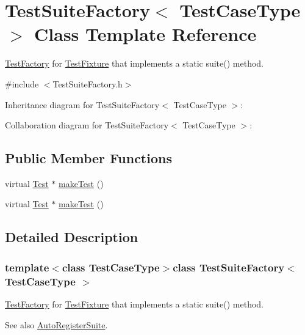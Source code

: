\hypertarget{class_test_suite_factory}{\section{Test\+Suite\+Factory$<$ Test\+Case\+Type $>$ Class Template Reference}
\label{class_test_suite_factory}
}


\hyperlink{class_test_factory}{Test\+Factory} for \hyperlink{class_test_fixture}{Test\+Fixture} that implements a static suite() method.  




{\ttfamily \#include $<$Test\+Suite\+Factory.\+h$>$}



Inheritance diagram for Test\+Suite\+Factory$<$ Test\+Case\+Type $>$\+:


Collaboration diagram for Test\+Suite\+Factory$<$ Test\+Case\+Type $>$\+:
\subsection*{Public Member Functions}
\begin{DoxyCompactItemize}
\item 
virtual \hyperlink{class_test}{Test} $\ast$ \hyperlink{class_test_suite_factory_a0790b11de1543fa894acd7069fd1f327}{make\+Test} ()
\item 
virtual \hyperlink{class_test}{Test} $\ast$ \hyperlink{class_test_suite_factory_a0790b11de1543fa894acd7069fd1f327}{make\+Test} ()
\end{DoxyCompactItemize}


\subsection{Detailed Description}
\subsubsection*{template$<$class Test\+Case\+Type$>$class Test\+Suite\+Factory$<$ Test\+Case\+Type $>$}

\hyperlink{class_test_factory}{Test\+Factory} for \hyperlink{class_test_fixture}{Test\+Fixture} that implements a static suite() method. 

\begin{DoxySeeAlso}{See also}
\hyperlink{class_auto_register_suite}{Auto\+Register\+Suite}. 
\end{DoxySeeAlso}


